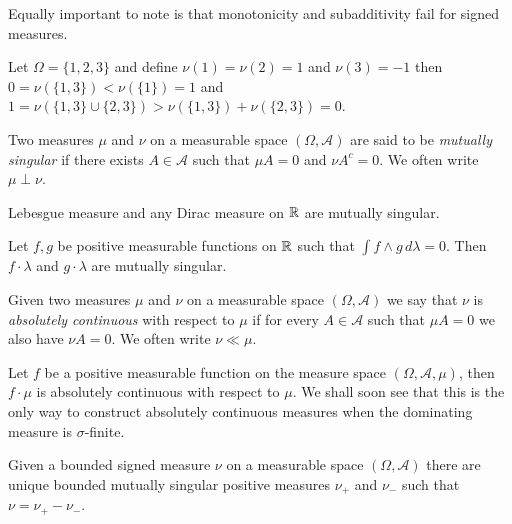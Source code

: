 Equally important to note is that monotonicity and subadditivity fail for signed measures.
\begin{examp}Let $\Omega = \lbrace 1,2,3 \rbrace$ and define $\nu(1) = \nu(2) = 1$ and $\nu(3) = -1$ then $0=\nu(\lbrace 1,3 \rbrace) < \nu(\lbrace 1 \rbrace)=1$ and $1 = \nu(\lbrace 1,3 \rbrace \cup \lbrace 2,3 \rbrace) > \nu(\lbrace 1,3 \rbrace) +  \nu(\lbrace 2,3 \rbrace) = 0$.
\end{examp}

\begin{defn}Two measures $\mu$ and $\nu$ on a measurable space $(\Omega,
  \mathcal{A})$ are said to be \emph{mutually singular} if there
  exists $A \in \mathcal{A}$ such that $\mu A = 0$ and $\nu A^c = 0$.
  We often write $\mu \perp \nu$.
\end{defn}
\begin{examp}Lebesgue measure and any Dirac measure on $\mathbb{R}$ are
  mutually singular.
\end{examp}
\begin{examp}Let $f,g$ be positive measurable functions on $\mathbb{R}$
  such that $\int f \wedge g \, d\lambda= 0$.  Then $f \cdot \lambda$ and $g
  \cdot \lambda$ are mutually singular.
\end{examp}
\begin{defn}Given two measures $\mu$ and $\nu$ on a measurable space $(\Omega,
  \mathcal{A})$ we say that $\nu$ is \emph{absolutely continuous} with
  respect to $\mu$ if for every $A \in \mathcal{A}$ such that $\mu A =
  0 $ we also have $\nu A = 0$.
  We often write $\nu \ll \mu$.
\end{defn}
\begin{examp}Let $f$ be a positive measurable function on the measure
  space $(\Omega,
  \mathcal{A}, \mu)$, then $f \cdot \mu$ is absolutely continuous with
  respect to $\mu$.  We shall soon see that this is the only way to
  construct absolutely continuous measures when the dominating measure is $\sigma$-finite.
\end{examp}
\begin{thm}\label{HahnDecomposition}Given a
  bounded signed measure $\nu$ on a measurable space $(\Omega,
  \mathcal{A})$ there are unique bounded mutually singular positive
  measures $\nu_+$ and $\nu_-$ such that $\nu = \nu_+ - \nu_-$.
\end{thm}
